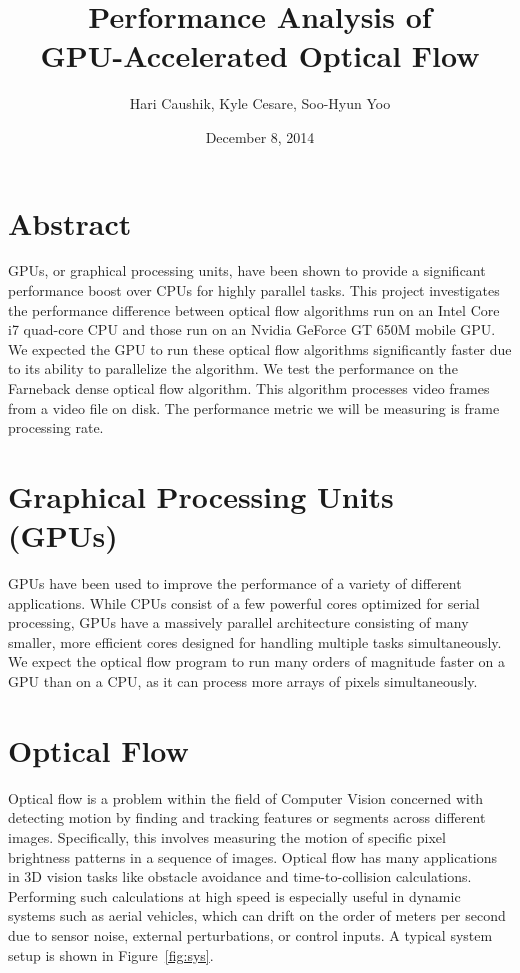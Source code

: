 \documentclass[12pt,letterpaper]{article}
\title{Performance Analysis of \\ GPU-Accelerated Optical Flow}
\date{December 8, 2014}
\author{Hari Caushik, Kyle Cesare, Soo-Hyun Yoo}
\begin{document}
\maketitle
\thispagestyle{empty}
\newpage

\tableofcontents
\newpage

\section{Abstract}
GPUs, or graphical processing units, have been shown to provide a significant
performance boost over CPUs for highly parallel tasks. This project
investigates the performance difference between optical flow algorithms run on
an Intel Core i7 quad-core CPU and those run on an Nvidia GeForce GT 650M
mobile GPU. We expected the GPU to run these optical flow algorithms
significantly faster due to its ability to parallelize the algorithm. We test
the performance on the Farneback dense optical flow algorithm. This algorithm
processes video frames from a video file on disk. The performance metric we
will be measuring is frame processing rate.

\section{Graphical Processing Units (GPUs)}
GPUs have been used to improve the performance of a variety of different
applications. While CPUs consist of a few powerful cores optimized for serial
processing, GPUs have a massively parallel architecture consisting of many
smaller, more efficient cores designed for handling multiple tasks
simultaneously. We expect the optical flow program to run many orders of
magnitude faster on a GPU than on a CPU, as it can process more arrays of
pixels simultaneously.

\section{Optical Flow}
Optical flow is a problem within the field of Computer Vision concerned with
detecting motion by finding and tracking features or segments across different
images. Specifically, this involves measuring the motion of specific pixel
brightness patterns in a sequence of images. Optical flow has many applications
in 3D vision tasks like obstacle avoidance and time-to-collision calculations.
Performing such calculations at high speed is especially useful in dynamic
systems such as aerial vehicles, which can drift on the order of meters per
second due to sensor noise, external perturbations, or control inputs.
A typical system setup is shown in Figure~\ref{fig:sys}.
\end{document}
